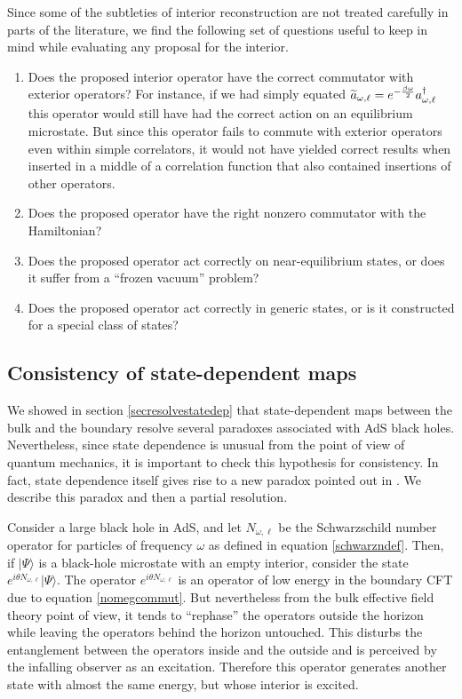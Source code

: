 \documentclass[12pt]{article}
\def\schwarzn{N}
\newcommand{\cop}[1]{#1}
\def\ta{\widetilde{\cop{a}}}
\begin{document}
Since some of the subtleties of interior reconstruction are not treated carefully in parts of the literature, we find the following set of questions useful to keep in mind while evaluating any proposal for the interior.
\begin{enumerate}
\item
Does the proposed interior operator have the correct commutator with exterior operators? For instance, if  we had simply equated $\ta_{\omega, \ell} = e^{-{\beta \omega \over 2}} a_{\omega, \ell}^{\dagger}$ this operator would still have had the correct action on an equilibrium microstate. But since this operator fails to commute with exterior operators even within simple correlators, it would not have yielded correct results when inserted in a middle of a correlation function that also contained insertions of other operators.
\item
Does the proposed operator have the right nonzero commutator with the Hamiltonian?
\item
Does the proposed operator act correctly on near-equilibrium states, or does it suffer from a ``frozen vacuum'' problem?
\item
Does the proposed operator act correctly in generic states, or is it constructed for a special class of states?
\end{enumerate}










\subsection{Consistency of  state-dependent maps \label{mpparadox}}
We showed in section \ref{secresolvestatedep} that state-dependent maps between the bulk and the boundary resolve several paradoxes associated with AdS black holes. Nevertheless, since state dependence is unusual from the point of view of quantum mechanics, it is important to check this hypothesis for consistency. In fact, state dependence itself gives rise to a new paradox pointed out in  \cite{Marolf:2015dia}. We describe this paradox and then a partial resolution.



Consider a large black hole in AdS, and let $\schwarzn_{\omega, \ell}$  be the Schwarzschild number operator for particles of frequency $\omega$ as defined in equation \eqref{schwarzndef}.  Then, if $|\Psi \rangle$ is a black-hole microstate with an empty interior,  consider the state $e^{i \theta \schwarzn_{\omega, \ell}} |\Psi \rangle$. The operator $e^{i \theta \schwarzn_{\omega, \ell}}$ is an operator of low energy in the boundary CFT due to equation \eqref{nomegcommut}.  But nevertheless from the bulk effective field theory point of view, it tends to ``rephase'' the operators outside the horizon while leaving the operators behind the horizon untouched. This disturbs the entanglement between the operators inside and the outside and is perceived by the infalling observer as an excitation. Therefore this operator generates another state with almost the same energy, but whose interior is excited.
\end{document}
